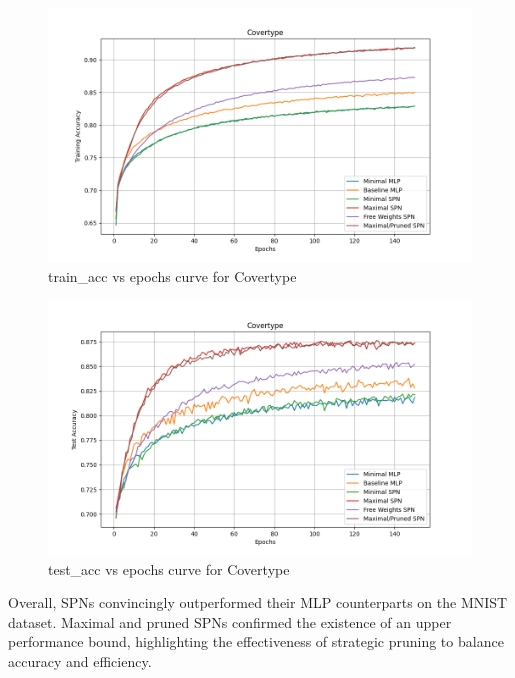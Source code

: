 \begin{figure}[H]
    \centering
    \includegraphics[width=\linewidth]{Figures/Results/Covertype/training_accuracy_plot.png} %
    \captionsetup{width=\linewidth}
    \caption{train\_acc vs epochs curve for Covertype}
    \label{fig:covertypeTrainCurve}
\end{figure}

\begin{figure}[H]
    \centering
    \includegraphics[width=\linewidth]{Figures/Results/Covertype/test_accuracy_plot.png} %
    \captionsetup{width=\linewidth}
    \caption{test\_acc vs epochs curve for Covertype}
    \label{fig:covertyoeTestCurve}
\end{figure}

Overall, SPNs convincingly outperformed their MLP counterparts on the MNIST dataset. Maximal and pruned SPNs confirmed the existence of an upper performance bound, highlighting the effectiveness of strategic pruning to balance accuracy and efficiency.

